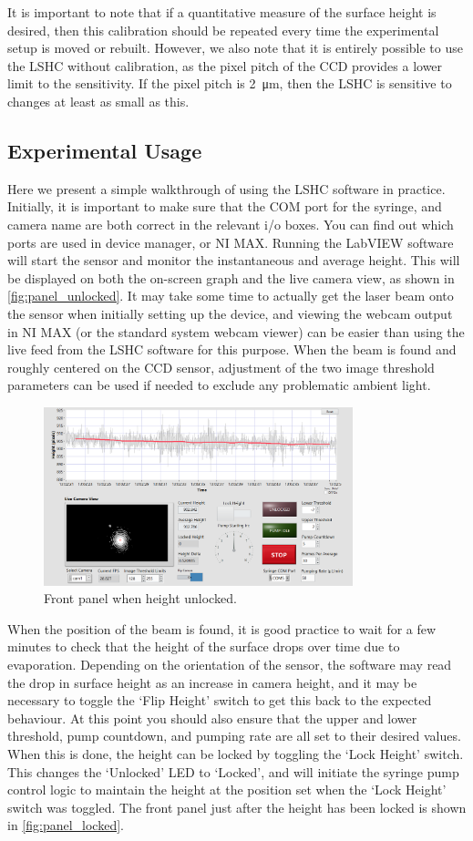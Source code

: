 \documentclass[11pt,a4paper,twoside]{article}
\begin{document}
It is important to note that if a quantitative measure of the surface height is desired, then this calibration should be repeated every time the experimental setup is moved or rebuilt. However, we also note that it is entirely possible to use the LSHC without calibration, as the pixel pitch of the CCD provides a lower limit to the sensitivity. If the pixel pitch is \SI{2}{\micro\metre}, then the LSHC is sensitive to changes at least as small as this.

\subsection{Experimental Usage}
Here we present a simple walkthrough of using the LSHC software in practice. Initially, it is important to make sure that the COM port for the syringe, and camera name are both correct in the relevant i/o boxes. You can find out which ports are used in device manager, or NI MAX. Running the LabVIEW software will start the sensor and monitor the instantaneous and average height. This will be displayed on both the on-screen graph and the live camera view, as shown in \autoref{fig:panel_unlocked}. It may take some time to actually get the laser beam onto the sensor when initially setting up the device, and viewing the webcam output in NI MAX (or the standard system webcam viewer) can be easier than using the live feed from the LSHC software for this purpose. When the beam is found and roughly centered on the CCD sensor, adjustment of the two image threshold parameters can be used if needed to exclude any problematic ambient light.
\begin{figure}[h]
\centering
\includegraphics[width=0.8\textwidth]{panel_unlocked}
\caption{Front panel when height unlocked.}\label{fig:panel_unlocked}
\end{figure}
When the position of the beam is found, it is good practice to wait for a few minutes to check that the height of the surface drops over time due to evaporation. Depending on the orientation of the sensor, the software may read the drop in surface height as an increase in camera height, and it may be necessary to toggle the `Flip Height' switch to get this back to the expected behaviour. At this point you should also ensure that the upper and lower threshold, pump countdown, and pumping rate are all set to their desired values.  When this is done, the height can be locked by toggling the `Lock Height' switch. This changes the `Unlocked' LED to `Locked', and will initiate the syringe pump control logic to maintain the height at the position set when the `Lock Height' switch was toggled. The front panel just after the height has been locked is shown in \autoref{fig:panel_locked}. 
\end{document}
